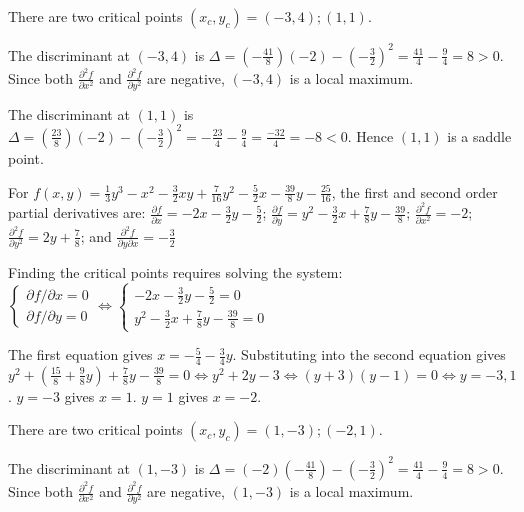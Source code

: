 \documentclass{article}
\newcommand{\partdiff}[2]{\frac{\partial #1}{\partial #2}}
\newcommand{\dr}[1]{\textcolor{dark_red}{#1}}
\begin{document}
\dr{There are two critical points \((x_c, y_c) = (-3,4); (1,1)\).}

\dr{The discriminant at \((-3,4)\) is \(\Delta = (-\frac{41}{8})(-2) - (-\frac{3}{2})^2 = \frac{41}{4} - \frac{9}{4} = 8 > 0\). Since both \(\frac{\partial^2 f}{\partial x^2}\) and \(\frac{\partial^2 f}{\partial y^2}\) are negative, \((-3,4)\) is a local maximum.}

\dr{The discriminant at \((1,1)\) is \(\Delta = (\frac{23}{8})(-2) - (-\frac{3}{2})^2 = -\frac{23}{4} - \frac{9}{4} = \frac{-32}{4} = -8 < 0\). Hence \((1,1)\) is a saddle point.}

\vspace{1cm}

\dr{For \(f(x,y) = \frac{1}{3}y^3 - x^2 - \frac{3}{2}xy + \frac{7}{16}y^2 - \frac{5}{2}x - \frac{39}{8}y - \frac{25}{16}\), the first and second order partial derivatives are: 
\(\partdiff{f}{x} = -2x - \frac{3}{2}y - \frac{5}{2}\); \(\partdiff{f}{y} = y^2 - \frac{3}{2}x + \frac{7}{8}y - \frac{39}{8}\); \(\frac{\partial^2 f}{\partial x^2} = -2\); \(\frac{\partial^2 f}{\partial y^2} = 2y + \frac{7}{8}\); and \(\frac{\partial^2 f}{\partial y \partial x} = -\frac{3}{2}\)}

\dr{Finding the critical points requires solving the system: \(\left\{\begin{array}{c} \partial f/\partial x = 0 \\ \partial f/\partial y = 0 \end{array}\right. \iff \left\{\begin{array}{c} -2x - \frac{3}{2}y - \frac{5}{2} = 0 \\ y^2 - \frac{3}{2}x + \frac{7}{8}y - \frac{39}{8} = 0 \end{array}\right.\)}

\dr{The first equation gives \(x = -\frac{5}{4} - \frac{3}{4}y\). Substituting into the second equation gives \\ \(y^2 + (\frac{15}{8} + \frac{9}{8}y) + \frac{7}{8}y - \frac{39}{8} = 0 \iff y^2 + 2y - 3 \iff (y + 3)(y - 1) = 0 \iff y = -3,1\). \(y = -3\) gives \(x = 1\). \(y = 1\) gives \(x = -2\).}

\dr{There are two critical points \((x_c, y_c) = (1,-3); (-2,1)\).}

\dr{The discriminant at \((1,-3)\) is \(\Delta = (-2)(-\frac{41}{8}) - (-\frac{3}{2})^2 = \frac{41}{4} - \frac{9}{4} = 8 > 0\). Since both \(\frac{\partial^2 f}{\partial x^2}\) and \(\frac{\partial^2 f}{\partial y^2}\) are negative, \((1,-3)\) is a local maximum.}
\end{document}
